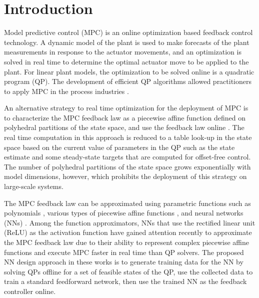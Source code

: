 \documentclass[preprint,5p, twocolumn, authoryear]{elsarticle}
\begin{document}
\section{Introduction} \label{sec:introduction}

Model predictive control (MPC) is an online optimization based feedback control
technology. A dynamic model of the plant is used to make forecasts of the plant
measurements in response to the actuator movements, and an optimization is
solved in real time to determine the optimal actuator move to be applied to the
plant. For linear plant models, the optimization to be solved online is a
quadratic program (QP). The development of efficient QP algorithms
\citep*{kouzoupis:frison:zanelli:diehl:2018, wright:2019} allowed practitioners
to apply MPC in the process industries \citep*{qin:badgwell:2003, lahiri:2017}.

An alternative strategy to real time optimization for the deployment of MPC is
to characterize the MPC feedback law as a piecewise affine function defined on
polyhedral partitions of the state space, and use the feedback law online
\citep*{bemporad:morari:dua:pistikopoulos:2002, seron:goodwin:dedona:2003}. The
real time computation in this approach is reduced to a table look-up in the
state space based on the current value of parameters in the QP such as the state
estimate and some steady-state targets that are computed for offset-free
control. The number of polyhedral partitions of the state space grows
exponentially with model dimensions, however, which prohibits the deployment of
this strategy on large-scale systems.

The MPC feedback law can be approximated using parametric functions such as
polynomials \citep*{kvasnica:lofberg:fikar:2011}, various types of piecewise
affine functions \citep*{bemporad:oliveri:poggi:storace:2011,
wen:ma:ydstie:2009}, and neural networks (NNs)
\citep*{cavagnari:magni:scattolini:1999}. Among the function approximators, NNs
that use the rectified linear unit (ReLU) as the activation function have gained
attention recently \citep*{chen:saulnier:atanasov:lee:kumar:pappas:morari:2018,
karg:lucia:2020, paulson:mesbah:2020, lovelett:dietrich:lee:kevrekidis:2020} to
approximate the MPC feedback law due to their ability to represent complex
piecewise affine functions \citep*{montufar:pascanu:cho:bengio:2014} and execute
MPC faster in real time than QP solvers. The proposed NN design approach in
these works is to generate training data for the NN by solving QPs offline for a
set of feasible states of the QP, use the collected data to train a standard
feedforward network, then use the trained NN as the feedback controller online.
\end{document}
